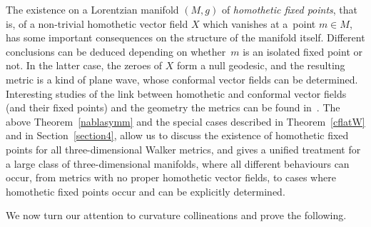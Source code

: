 \documentclass[10pt,a4paper]{amsart}
\numberwithin{equation}{section}
\begin{document}
\begin{Remark}
The existence on a Lorentzian manifold $(M,g)$ of {\em homothetic fixed points}, that is, of a non-trivial homothetic vector f\/ield $X$ which vanishes at a~point $m\in M$, has some important consequences on the structure of the manifold itself. Dif\/ferent conclusions can be deduced depending on whether~$m$ is an isolated f\/ixed point or not. In the latter case, the zeroes of $X$ form a null geodesic, and the resulting metric is a kind of plane wave, whose conformal vector f\/ields can be determined. Interesting studies of the link between homothetic and conformal vector f\/ields (and their f\/ixed points) and the geometry the metrics can be found in~\cite{Ale,Beem,HC,HLP}. The above Theorem~\ref{nablasymm} and the special cases described in Theorem~\ref{cflatW} and in Section~\ref{section4}, allow us to discuss the existence of homothetic f\/ixed points for all three-dimensional Walker metrics, and gives a unif\/ied treatment for a large class of three-dimensional manifolds, where all dif\/ferent behaviours can occur, from metrics with no proper homothetic vector f\/ields, to cases where homothetic f\/ixed points occur and can be explicitly determined.
\end{Remark}

We now turn our attention to curvature collineations and prove the following.
\end{document}
